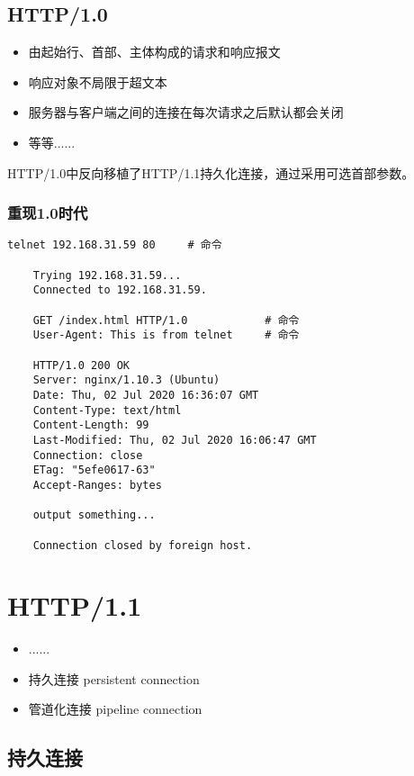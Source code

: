 \subsection{HTTP/1.0}

\begin{itemize}
    \item  由起始行、首部、主体构成的请求和响应报文
    \item 响应对象不局限于超文本
    \item 服务器与客户端之间的连接在每次请求之后默认都会关闭
    \item 等等......
\end{itemize}

HTTP/1.0中反向移植了HTTP/1.1持久化连接，通过采用可选首部参数。


\subsubsection{重现1.0时代}

\begin{lstlisting}[style=cshell]
    telnet 192.168.31.59 80     # 命令

    Trying 192.168.31.59...
    Connected to 192.168.31.59.

    GET /index.html HTTP/1.0            # 命令
    User-Agent: This is from telnet     # 命令

    HTTP/1.0 200 OK
    Server: nginx/1.10.3 (Ubuntu)
    Date: Thu, 02 Jul 2020 16:36:07 GMT
    Content-Type: text/html
    Content-Length: 99
    Last-Modified: Thu, 02 Jul 2020 16:06:47 GMT
    Connection: close
    ETag: "5efe0617-63"
    Accept-Ranges: bytes

    output something... 

    Connection closed by foreign host.
\end{lstlisting}


\section{HTTP/1.1}

\begin{itemize}
    \item ...... 
    \item 持久连接    persistent connection
    \item 管道化连接   pipeline connection
\end{itemize}


\subsection{持久连接}

